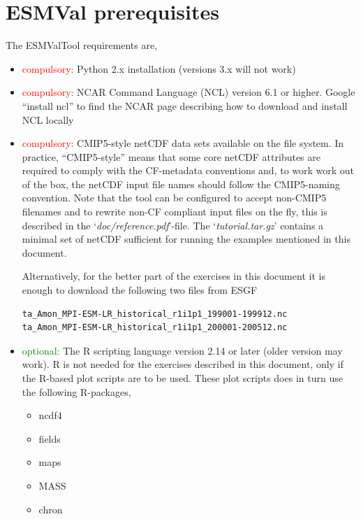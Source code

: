 \documentclass[12pt]{article}
\newcommand{\docref}[1]{`\emph{#1}'}
\begin{document}
\section{ESMVal prerequisites}\label{section:prerequisites}
The ESMValTool requirements are, 
\begin{itemize}
\item{\textcolor{red}{compulsory:}} Python 2.x installation (versions
3.x will not work)

\item{\textcolor{red}{compulsory:}} NCAR Command Language
(NCL)\cite{ncar-ncl-homepage} version 6.1 or higher. Google ``install
ncl'' to find the NCAR page describing how to download and install NCL
locally

\item{\textcolor{red}{compulsory:}} CMIP5-style\cite{pcmdi-cmip5}
netCDF data sets available on the file system. In practice,
``CMIP5-style'' means that some core netCDF attributes are required to
comply with the CF-metadata conventions\cite{pcmdi-cf-conventions}
and, to work work out of the box, the netCDF input file names should
follow the CMIP5-naming convention\cite{DRS-document:2010}. Note that
the tool can be configured to accept non-CMIP5 filenames and to
rewrite non-CF compliant input files on the fly, this is described in
the \docref{doc/reference.pdf}-file. The
\docref{tutorial.tar.gz}\cite{tutorial-tarball} contains a minimal set
of netCDF sufficient for running the examples mentioned in this
document. 

Alternatively, for the better part of the exercises in this document
it is enough to download the following two files from ESGF\cite{esgf}

\begin{Verbatim}[frame=single, fontsize=\footnotesize]
ta_Amon_MPI-ESM-LR_historical_r1i1p1_199001-199912.nc
ta_Amon_MPI-ESM-LR_historical_r1i1p1_200001-200512.nc
\end{Verbatim}

\item{\textcolor{green}{optional:}} The R scripting
language\cite{R-language-ref:2013} version 2.14 or later (older
version may work). R is not needed for the exercises described in this
document, only if the R-based plot scripts are to be used. These plot
scripts does in turn use the following R-packages, 
\begin{itemize}
\item ncdf4
\item fields
\item maps
\item MASS
\item chron
\end{itemize}

\end{itemize}
\end{document}
